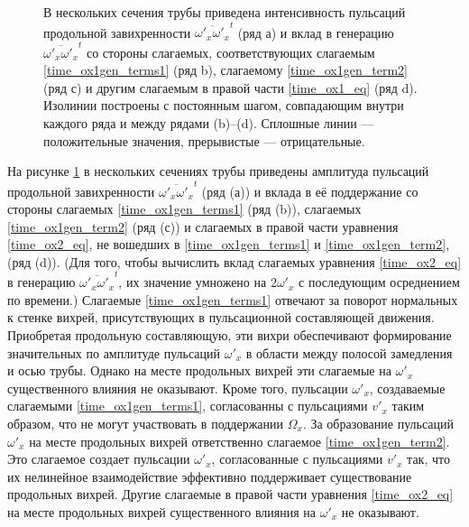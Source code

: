 \begin{figure}[h!]
\caption{В нескольких сечения трубы приведена интенсивность пульсаций продольной завихренности $\overline{\omega'_x \omega'_x}^t$ (ряд а) и вклад в генерацию $\overline{\omega'_x \omega'_x}^t$ со стороны слагаемых, соответствующих слагаемым \eqref{time_ox1gen_terms1} (ряд b), слагаемому \eqref{time_ox1gen_term2} (ряд с) и другим слагаемым в правой части \eqref{time_ox1_eq} (ряд d). Изолинии построены с постоянным шагом, совпадающим внутри каждого ряда и между рядами (b)--(d). Сплошные линии --- положительные значения, прерывистые --- отрицательные.}
\label{mp_ox1gen_pic}
\end{figure}


На рисунке \ref{mp_ox1gen_pic} в нескольких сечениях трубы приведены амплитуда пульсаций продольной завихренности $\overline{\omega'_x \omega'_x}^t$ (ряд (а)) и вклада в её поддержание со стороны слагаемых \eqref{time_ox1gen_terms1} (ряд (b)), слагаемых \eqref{time_ox1gen_term2} (ряд (с)) и слагаемых в правой части уравнения \eqref{time_ox2_eq}, не вошедших в \eqref{time_ox1gen_terms1} и \eqref{time_ox1gen_term2}, (ряд (d)). (Для того, чтобы вычислить вклад слагаемых уравнения \eqref{time_ox2_eq} в генерацию $\overline{\omega'_x \omega'_x}^t$, их значение умножено на $2\omega'_x$ с последующим осреднением по времени.) Слагаемые \eqref{time_ox1gen_terms1} отвечают за поворот нормальных к стенке вихрей, присутствующих в пульсационной составляющей движения. Приобретая продольную составляющую, эти вихри обеспечивают формирование значительных по амплитуде пульсаций $\omega'_x$ в области между полосой замедления и осью трубы. Однако на месте продольных вихрей эти слагаемые на $\omega'_x$ существенного влияния не оказывают. Кроме того, пульсации $\omega'_x$, создаваемые слагаемыми \eqref{time_ox1gen_terms1}, согласованны с пульсациями $v'_x$ таким образом, что не могут участвовать в поддержании $\Omega_x$. За образование пульсаций $\omega'_x$ на месте продольных вихрей ответственно слагаемое \eqref{time_ox1gen_term2}. Это слагаемое создает пульсации $\omega'_x$, согласованные с пульсациями $v'_x$ так, что их нелинейное взаимодействие эффективно поддерживает существование продольных вихрей. Другие слагаемые в правой части уравнения \eqref{time_ox2_eq} на месте продольных вихрей существенного влияния на $\omega'_x$ не оказывают. 


